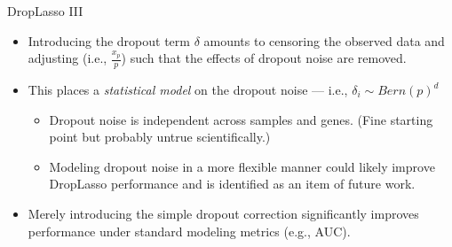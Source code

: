 \documentclass{beamer}
\begin{document}

\begin{frame}{DropLasso III}

\begin{itemize}
  \itemsep12pt
  \item Introducing the dropout term $\delta$ amounts to censoring the observed
    data and adjusting (i.e., $\frac{x_p}{p}$) such that the effects of dropout
    noise are removed.
  \item This places a \textit{statistical model} on the dropout noise --- i.e.,
    $\delta_i \sim Bern(p)^d$
    \begin{itemize}
      \item Dropout noise is independent across samples and genes. (Fine
        starting point but probably untrue scientifically.)
      \item Modeling dropout noise in a more flexible manner could likely
        improve DropLasso performance and is identified as an item of future
        work.
    \end{itemize}
  \item Merely introducing the simple dropout correction significantly improves
    performance under standard modeling metrics (e.g., AUC).
\end{itemize}

\end{frame}

\end{document}
